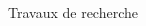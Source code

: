 \documentclass[compress,10pt,aspectratio=169]{beamer}
\begin{document}
\begin{frame}{Travaux de recherche}
\begin{columns}
        \begin{column}{0.25
        \textwidth}
\centering
{}
\end{column}
\end{columns}
\end{frame}
\end{document}
